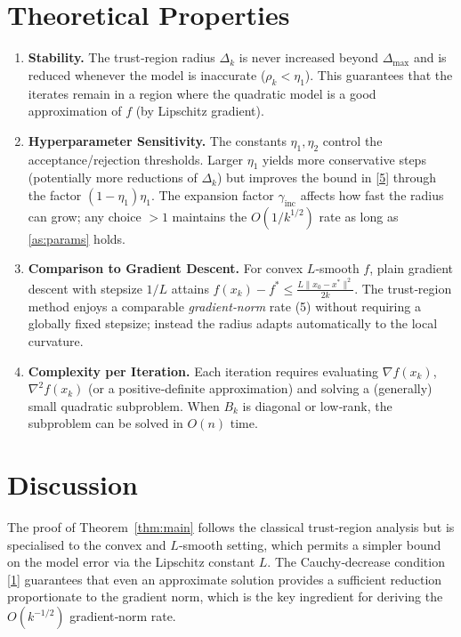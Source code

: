 \documentclass{article}
\begin{document}
\section*{Theoretical Properties}
\begin{enumerate}[label=\arabic*)]
\item \textbf{Stability.}  The trust‑region radius $\Delta_{k}$ is never increased beyond
$\Delta_{\max}$ and is reduced whenever the model is inaccurate
($\rho_{k}<\eta_{1}$).  This guarantees that the iterates remain in a region where the
quadratic model is a good approximation of $f$ (by Lipschitz gradient).

\item \textbf{Hyperparameter Sensitivity.}
The constants $\eta_{1},\eta_{2}$ control the acceptance/rejection thresholds.
Larger $\eta_{1}$ yields more conservative steps (potentially more reductions of $\Delta_{k}$)
but improves the bound in \eqref{5} through the factor $(1-\eta_{1})\eta_{1}$.
The expansion factor $\gamma_{\mathrm{inc}}$ affects how fast the radius can grow; any
choice $>1$ maintains the $O(1/k^{1/2})$ rate as long as \ref{as:params} holds.

\item \textbf{Comparison to Gradient Descent.}
For convex $L$‑smooth $f$, plain gradient descent with stepsize $1/L$ attains
$f(x_{k})-f^{*}\le \frac{L\|x_{0}-x^{*}\|^{2}}{2k}$.
The trust‑region method enjoys a comparable \emph{gradient‑norm} rate (5) without
requiring a globally fixed stepsize; instead the radius adapts automatically to the
local curvature.

\item \textbf{Complexity per Iteration.}
Each iteration requires evaluating $\nabla f(x_{k})$, $\nabla^{2}f(x_{k})$ (or a
positive‑definite approximation) and solving a (generally) small quadratic
subproblem.  When $B_{k}$ is diagonal or low‑rank, the subproblem can be solved in
$O(n)$ time.

\end{enumerate}

\section*{Discussion}
The proof of Theorem~\ref{thm:main} follows the classical trust‑region analysis
but is specialised to the convex and $L$‑smooth setting, which permits a
simpler bound on the model error via the Lipschitz constant $L$.  The
Cauchy‑decrease condition \eqref{1} guarantees that even an approximate solution
provides a sufficient reduction proportionate to the gradient norm, which is the
key ingredient for deriving the $O(k^{-1/2})$ gradient‑norm rate.
\end{document}
